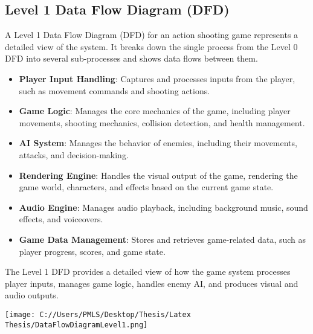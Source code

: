 \subsection{Level 1 Data Flow Diagram (DFD)}
A Level 1 Data Flow Diagram (DFD) for an action shooting game represents a detailed view of the system. It breaks down the single process from the Level 0 DFD into several sub-processes and shows data flows between them.
\begin{itemize}
	\item \textbf{Player Input Handling}: Captures and processes inputs from the player, such as movement commands and shooting actions.
	\item \textbf{Game Logic}: Manages the core mechanics of the game, including player movements, shooting mechanics, collision detection, and health management.
	\item \textbf{AI System}: Manages the behavior of enemies, including their movements, attacks, and decision-making.
	\item \textbf{Rendering Engine}: Handles the visual output of the game, rendering the game world, characters, and effects based on the current game state.
	\item \textbf{Audio Engine}: Manages audio playback, including background music, sound effects, and voiceovers.
	\item \textbf{Game Data Management}: Stores and retrieves game-related data, such as player progress, scores, and game state.
\end{itemize}

The Level 1 DFD provides a detailed view of how the game system processes player inputs, manages game logic, handles enemy AI, and produces visual and audio outputs.

\texttt{[image: C://Users/PMLS/Desktop/Thesis/Latex Thesis/DataFlowDiagramLevel1.png]}


